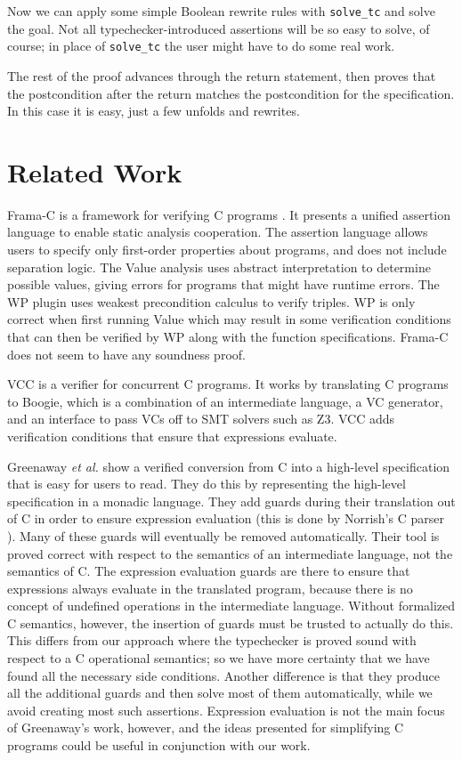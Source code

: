 \documentclass{puthesis}
\begin{document}
Now we can apply some simple Boolean
rewrite rules with \lstinline|solve_tc| and solve the goal.
Not all typechecker-introduced assertions will be so easy
to solve, of course; in place of \lstinline|solve_tc|
the user might have to do some real work.

The rest of the proof advances through the return statement, then proves that
the postcondition after the return matches the postcondition for the 
specification. In this case it is easy, just a few unfolds and rewrites.


\section{Related Work}
Frama-C is a framework for verifying C programs \cite{cuoq2012frama}. It presents a unified assertion
language to enable static analysis cooperation. The assertion language allows users to specify only first-order properties 
about programs, and does not include separation logic. The Value analysis \cite{canet2009value} uses abstract interpretation to determine possible values, giving errors for programs
that might have runtime errors. The WP plugin uses weakest precondition calculus to verify triples. 
WP is only correct when first running Value which may result in some verification
conditions that can then be verified by WP along with the function specifications. Frama-C does not seem to have any
soundness proof.

VCC is a verifier for concurrent C programs. It works by translating C programs to 
Boogie, which is a combination of an intermediate language, a VC generator, and an
interface to pass VCs off to SMT solvers such as Z3.
VCC adds verification conditions that ensure that expressions
evaluate.

Greenaway \emph{et al.} \cite{greenaway12} show a verified conversion from C
into a high-level specification that is easy for users to read. They do this
by representing the high-level specification in a monadic language.
They add guards during their translation out of C in order to ensure
expression evaluation (this is done by Norrish's C parser
\cite{norrish:parser}). Many of these guards will eventually be removed
automatically. Their tool is proved correct with respect to the semantics of an
intermediate language, not the semantics of C. The expression evaluation guards are there
to ensure that expressions always evaluate in the translated program, because
there is no concept of undefined operations in the intermediate language.
Without formalized C semantics, however, the insertion of guards must be
trusted to actually do this. This differs from our approach where the
typechecker is proved sound with respect to a C operational semantics;
so we have more certainty that we have found all the necessary side conditions.
Another difference is that they produce all the additional guards and then
solve most of them automatically,  while we avoid creating
most such assertions. Expression evaluation
is not the main focus of Greenaway's work, however, and the ideas presented for
simplifying C programs could be useful in conjunction with our work. 
\end{document}
